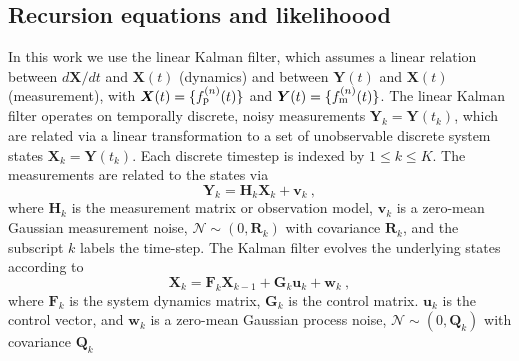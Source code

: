 \documentclass[fleqn,usenatbib,useAMS]{mnras}
\begin{document}
\subsection{Recursion equations and likelihoood }\label{sec_kalman_general}
In this work we use the linear Kalman filter, which assumes a linear relation between $d{\boldsymbol{X}}/dt$ and ${\boldsymbol{X}}(t)$ (dynamics) and between ${\boldsymbol{Y}}(t)$ and ${\boldsymbol{X}}(t)$ (measurement), with ${\boldsymbol{X}}(t) = \{ f_{\rm p}^{(n)}(t) \}$ and ${\boldsymbol{Y}}(t) = \{ f_{\rm m}^{(n)}(t) \}$. The linear Kalman filter operates on temporally discrete, noisy measurements $\boldsymbol{Y}_k = \boldsymbol{Y}(t_k)$, which are related via a linear transformation to a set of unobservable discrete system states $\boldsymbol{X}_k= \boldsymbol{Y}(t_k)$. Each discrete timestep is indexed by $ 1 \leq k  \leq K$. The measurements are related to the states via
\begin{equation}
	\boldsymbol{Y}_k = \boldsymbol{H}_k \boldsymbol{X}_k + \boldsymbol{v}_k \ ,\label{eq:kalman1}
\end{equation}
where $\boldsymbol{H}_k$ is the measurement matrix or observation model, $\boldsymbol{v}_k$ is a zero-mean Gaussian measurement noise, $\mathcal{N} \sim (0,\boldsymbol{R}_k)$ with covariance $\boldsymbol{R}_k$, and the subscript $k$ labels the time-step. The Kalman filter evolves the underlying states according to
\begin{equation}
	\boldsymbol{X}_k = \boldsymbol{F}_k \boldsymbol{X}_{k-1} + \boldsymbol{G}_k \boldsymbol{u}_k + \boldsymbol{w}_k \ , \label{eq:kalman2}
\end{equation}
where $\boldsymbol{F}_k$ is the system dynamics matrix, $\boldsymbol{G}_k$ is the control matrix. $\boldsymbol{u}_k$ is the control vector, and $\boldsymbol{w}_k$ is a zero-mean Gaussian process noise, $\mathcal{N} \sim (0,\boldsymbol{Q}_k)$ with covariance $\boldsymbol{Q}_k$ \newline 
\end{document}
